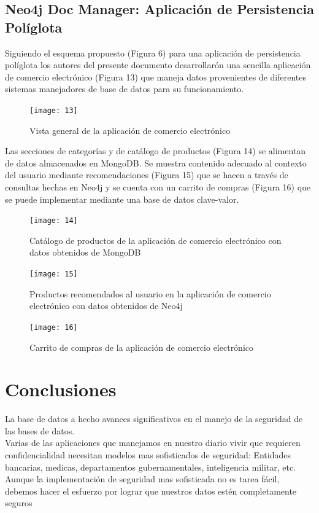\documentclass[conference]{IEEEtran}
\begin{document}
\subsection*{Neo4j Doc Manager: Aplicaci\'on de Persistencia Pol\'iglota}

Siguiendo el esquema propuesto (Figura 6) para una aplicaci\'on de persistencia pol\'iglota  los autores del presente documento desarrollar\'on una sencilla aplicaci\'on de comercio electr\'onico (Figura 13) que maneja datos provenientes de diferentes sistemas manejadores de base de datos para su funcionamiento.

\begin{figure}[!h]
\centering
\texttt{[image: 13]}
\caption{Vista general de la aplicaci\'on de comercio electr\'onico}
\label{}
\end{figure}

Las secciones de categor\'ias y de cat\'alogo de productos (Figura 14) se alimentan de datos almacenados en MongoDB. Se muestra contenido adecuado al contexto del usuario mediante recomendaciones (Figura 15) que se hacen a trav\'es de consultas hechas en Neo4j y se cuenta con un carrito de compras (Figura 16) que se puede implementar mediante una base de datos clave-valor.

\begin{figure}[!h]
\centering
\texttt{[image: 14]}
\caption{Cat\'alogo de productos de la aplicaci\'on de comercio electr\'onico con datos obtenidos de MongoDB}
\label{}
\end{figure}

\begin{figure}[!h]
\centering
\texttt{[image: 15]}
\caption{Productos recomendados al usuario en la aplicaci\'on de comercio electr\'onico con datos obtenidos de Neo4j}
\label{}
\end{figure}

\begin{figure}[!h]
\centering
\texttt{[image: 16]}
\caption{Carrito de compras de la aplicaci\'on de comercio electr\'onico}
\label{}
\end{figure}


\section{Conclusiones}
  La base de datos a hecho avances significativos en el manejo de la seguridad de las bases de datos.
  \\
  Varias de las aplicaciones que manejamos en nuestro diario vivir que requieren confidencialidad necesitan modelos mas sofisticados de seguridad: Entidades bancarias, medicas, departamentos gubernamentales, inteligencia militar, etc.
  \\
  Aunque la implementación de seguridad mas sofisticada no es tarea fácil, debemos hacer el esfuerzo por lograr que nuestros datos estén completamente seguros
\end{document}
